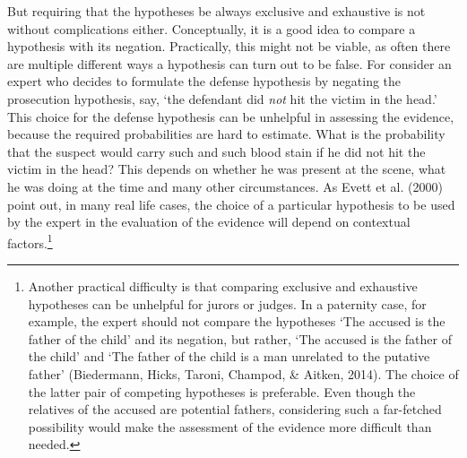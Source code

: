 \documentclass[
  letterpaper,
  DIV=11,
  numbers=noendperiod]{scrartcl}
\begin{document}
But requiring that the hypotheses be always exclusive and exhaustive is
not without complications either. Conceptually, it is a good idea to
compare a hypothesis with its negation. Practically, this might not be
viable, as often there are multiple different ways a hypothesis can turn
out to be false. For consider an expert who decides to formulate the
defense hypothesis by negating the prosecution hypothesis, say, `the
defendant did \textit{not} hit the victim in the head.' This choice for
the defense hypothesis can be unhelpful in assessing the evidence,
because the required probabilities are hard to estimate. What is the
probability that the suspect would carry such and such blood stain if he
did not hit the victim in the head? This depends on whether he was
present at the scene, what he was doing at the time and many other
circumstances. As Evett et al. (2000) point out, in many real life
cases, the choice of a particular hypothesis to be used by the expert in
the evaluation of the evidence will depend on contextual
factors.\footnote{Another practical difficulty is that comparing
  exclusive and exhaustive hypotheses can be unhelpful for jurors or
  judges. In a paternity case, for example, the expert should not
  compare the hypotheses `The accused is the father of the child' and
  its negation, but rather, `The accused is the father of the child' and
  `The father of the child is a man unrelated to the putative father'
  (Biedermann, Hicks, Taroni, Champod, \& Aitken, 2014). The choice of
  the latter pair of competing hypotheses is preferable. Even though the
  relatives of the accused are potential fathers, considering such a
  far-fetched possibility would make the assessment of the evidence more
  difficult than needed.}
\end{document}

